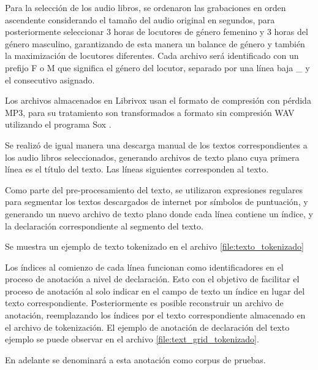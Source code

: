 Para la selección de los audio libros, se ordenaron las grabaciones en orden ascendente considerando el tamaño del audio original en segundos, para posteriormente seleccionar 3 horas de locutores de género femenino y 3 horas del género masculino, garantizando de esta manera un balance de género y también la maximización de locutores diferentes. Cada archivo será identificado con un prefijo F o M que significa el género del locutor, separado por una línea baja \_ y el consecutivo asignado.

Los archivos almacenados en Librivox usan el formato de compresión con pérdida MP3, para su tratamiento son transformados a formato sin compresión WAV utilizando el programa Sox \cite{Sox}.

Se realizó de igual manera una descarga manual de los textos correspondientes a los audio libros seleccionados, generando archivos de texto plano cuya primera línea es el título del texto. Las líneas siguientes corresponden al texto.

Como parte del pre-procesamiento del texto, se utilizaron expresiones regulares para segmentar los textos descargados de internet por símbolos de puntuación, y generando un nuevo archivo de texto plano donde cada línea contiene un índice, y la declaración correspondiente al segmento del texto.

Se muestra un ejemplo de texto tokenizado en el archivo \ref{file:texto_tokenizado}



Los índices al comienzo de cada línea funcionan como identificadores en el proceso de anotación a nivel de declaración. Esto con el objetivo de facilitar el proceso de anotación al solo indicar en el campo de texto un índice en lugar del texto correspondiente. Posteriormente es posible reconstruir un archivo de anotación, reemplazando los índices por el texto correspondiente almacenado en el archivo de tokenización. El ejemplo de anotación de declaración del texto ejemplo se puede observar en el archivo \ref{file:text_grid_tokenizado}.




En adelante se denominará a esta anotación como corpus de pruebas.




